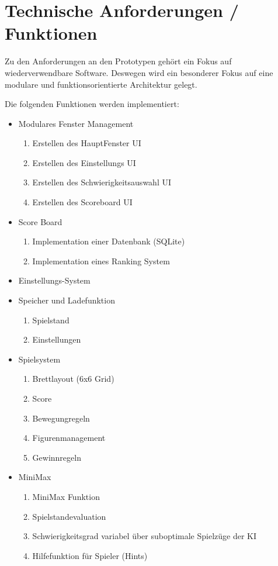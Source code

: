 \documentclass[14pt]{scrartcl}
\begin{document}
\section{Technische Anforderungen / Funktionen}

Zu den Anforderungen an den Prototypen gehört ein Fokus auf wiederverwendbare Software. Deswegen wird ein besonderer Fokus auf 
eine modulare und funktionsorientierte Architektur gelegt.\par


Die folgenden Funktionen werden implementiert: \newline

\begin{itemize}
\item Modulares Fenster Management
\begin{enumerate}
    \item Erstellen des HauptFenster UI
    \item Erstellen des Einstellungs UI
    \item Erstellen des Schwierigkeitsauswahl UI
    \item Erstellen des Scoreboard UI
\end{enumerate}

\item Score Board
\begin{enumerate}
    \item Implementation einer Datenbank (SQLite)
    \item Implementation eines Ranking System
\end{enumerate}

\item Einstellungs-System

\item Speicher und Ladefunktion
\begin{enumerate}
    \item Spielstand
    \item Einstellungen
\end{enumerate}

\item Spielsystem
\begin{enumerate}
    \item Brettlayout (6x6 Grid)
    \item Score
    \item Bewegungregeln
    \item Figurenmanagement
    \item Gewinnregeln
\end{enumerate}

\item MiniMax
\begin{enumerate}
    \item MiniMax Funktion
    \item Spielstandevaluation 
    \item Schwierigkeitsgrad variabel über suboptimale Spielzüge der KI
    \item Hilfefunktion für Spieler (Hints)
\end{enumerate}

\end{itemize}
\end{document}
